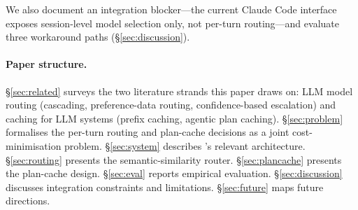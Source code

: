 We also document an integration blocker---the current Claude Code
interface exposes session-level model selection only, not per-turn
routing---and evaluate three workaround paths
(\S\ref{sec:discussion}).

\paragraph{Paper structure.}
\S\ref{sec:related} surveys the two literature strands this paper
draws on: LLM model routing (cascading, preference-data routing,
confidence-based escalation) and caching for LLM systems (prefix
caching, agentic plan caching). \S\ref{sec:problem} formalises the
per-turn routing and plan-cache decisions as a joint cost-minimisation
problem. \S\ref{sec:system} describes \blackrim's relevant
architecture. \S\ref{sec:routing} presents the semantic-similarity
router. \S\ref{sec:plancache} presents the plan-cache design.
\S\ref{sec:eval} reports empirical evaluation. \S\ref{sec:discussion}
discusses integration constraints and limitations.
\S\ref{sec:future} maps future directions.
